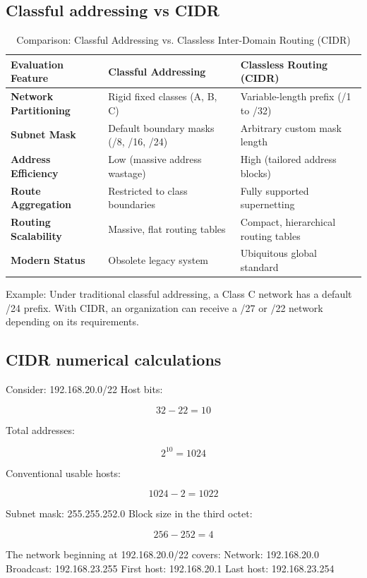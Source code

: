 \subsection{Classful addressing vs CIDR}
\begin{table}[htbp]
\centering
\caption{Comparison: Classful Addressing vs. Classless Inter-Domain Routing (CIDR)}
\label{tab:classful_vs_cidr}
\begin{tabularx}{\textwidth}{p{3.8cm} X X}
\toprule
\textbf{Evaluation Feature} & \textbf{Classful Addressing} & \textbf{Classless Routing (CIDR)} \\
\midrule
\textbf{Network Partitioning} & Rigid fixed classes (A, B, C) & Variable-length prefix (/1 to /32) \\
\textbf{Subnet Mask} & Default boundary masks (/8, /16, /24) & Arbitrary custom mask length \\
\textbf{Address Efficiency} & Low (massive address wastage) & High (tailored address blocks) \\
\textbf{Route Aggregation} & Restricted to class boundaries & Fully supported supernetting \\
\textbf{Routing Scalability} & Massive, flat routing tables & Compact, hierarchical routing tables \\
\textbf{Modern Status} & Obsolete legacy system & Ubiquitous global standard \\
\bottomrule
\end{tabularx}
\end{table}
Example:
Under traditional classful addressing, a Class C network has a default /24 prefix.
With CIDR, an organization can receive a /27 or /22 network depending on its requirements.
\subsection{CIDR numerical calculations}
Consider:
192.168.20.0/22
Host bits:

\[
32-22=10
\]

Total addresses:

\[
2^{10}=1024
\]

Conventional usable hosts:

\[
1024-2=\boxed{1022}
\]

Subnet mask:
255.255.252.0
Block size in the third octet:

\[
256-252=4
\]

The network beginning at 192.168.20.0/22 covers:
Network: 192.168.20.0
Broadcast: 192.168.23.255
First host: 192.168.20.1
Last host: 192.168.23.254
